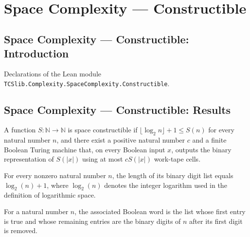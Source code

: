 \section{Space Complexity --- Constructible}
\subsection*{Space Complexity --- Constructible: Introduction}

Declarations of the Lean module \texttt{TCSlib.Complexity.SpaceComplexity.Constructible}.

\subsection*{Space Complexity --- Constructible: Results}

\begin{definition}
\label{Complexity.SpaceConstructible}
\leanok
{}
A function $S:\mathbb{N}\to\mathbb{N}$ is space constructible if $\lfloor\log_2
n\rfloor+1\le S(n)$ for every natural number $n$, and there exist a positive natural
number $c$ and a finite Boolean Turing machine that, on every Boolean input $x$, outputs
the binary representation of $S(|x|)$ using at most $cS(|x|)$ work-tape cells.
\end{definition}

\begin{lemma}
\label{Complexity.b3a_bits_length}
\leanok
{}
For every nonzero natural number $n$, the length of its binary digit list equals
$\log_2(n)+1$, where $\log_2(n)$ denotes the integer logarithm used in the definition of
logarithmic space.
\end{lemma}

\begin{definition}[B3a Word]
\label{Complexity.b3a_word}
\leanok
For a natural number $n$, the associated Boolean word is the list whose first entry is
true and whose remaining entries are the binary digits of $n$ after its first digit is
removed.
\end{definition}

